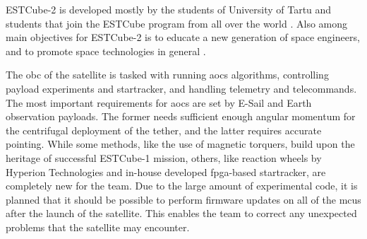 ESTCube-2 is developed mostly by the students of University of Tartu and students that join the ESTCube program from all over the world \cite{Ehrpais2016}. Also among main objectives for ESTCube-2 is to educate a new generation of space engineers, and to promote space technologies in general \cite{Iakubivskyi2016}.

The \gls{obc} of the satellite is tasked with running \gls{aocs} algorithms, controlling payload experiments and startracker, and handling telemetry and telecommands. The most important requirements for \gls{aocs} are set by E-Sail and Earth observation payloads. The former needs sufficient enough angular momentum for the centrifugal deployment of the tether, and the latter requires accurate pointing. While some methods, like the use of magnetic torquers, build upon the heritage of successful ESTCube-1 mission, others, like reaction wheels by Hyperion Technologies and in-house developed \gls{fpga}-based startracker, are completely new for the team. Due to the large amount of experimental code, it is planned that it should be possible to perform firmware updates on all of the \glspl{mcu} after the launch of the satellite. This enables the team to correct any unexpected problems that the satellite may encounter. \cite{Ehrpais2016}

